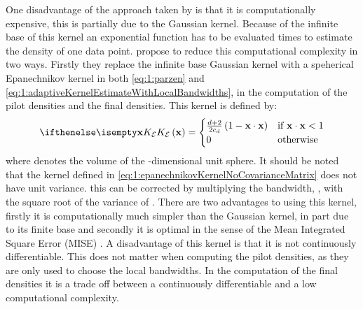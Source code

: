 	One disadvantage of the approach taken by \citeauthor{breiman1977variable} is that it is computationally expensive, this is partially due to the Gaussian kernel. Because of the infinite base of this kernel an exponential function has to be evaluated \varNumPatterns times to estimate the density of one data point. 
	\textcite{wilkinson1995dataplot} propose to reduce this computational complexity in two ways. Firstly they replace the infinite base Gaussian kernel with a speherical Epanechnikov kernel in both \cref{eq:1:parzen} and \cref{eq:1:adaptiveKernelEstimateWithLocalBandwidths}, \ie in the computation of the pilot densities and the final densities. This kernel is defined by:
	\begin{equation}\label{eq:1:epanechnikovKernelNoCovarianceMatrix}
		\varKernel[\varEpan]{\varPattern} = 
		\begin{cases}
			\frac{\varDim + 2}{2\varUnitSphere{\varDim}} \left( 1 - \varPattern \cdot \varPattern \right) & \text{if } \varPattern \cdot \varPattern < 1\\
			0 & \text{otherwise}
		\end{cases}
	\end{equation}
	 where \varUnitSphere{\varDim} denotes the volume of the \varDim-dimensional unit sphere. It should be noted that the kernel defined in \cref{eq:1:epanechnikovKernelNoCovarianceMatrix} does not have unit variance. this can be corrected by multiplying the bandwidth, \varBandwidth,  with the square root of the variance of \varKernel[\varEpan]{}. There are two advantages to using this kernel, firstly it is computationally much simpler than the Gaussian kernel, in part due to its finite base and secondly it is optimal in the sense of the Mean Integrated Square Error (MISE) \cite{epanechnikov1969non}. A disadvantage of this kernel is that it is not continuously differentiable. This does not matter when computing the pilot densities, as they are only used to choose the local bandwidths. In the computation of the final densities it is a trade off between a continuously differentiable \varEstimatedDensityFunction{} and a low computational complexity.

